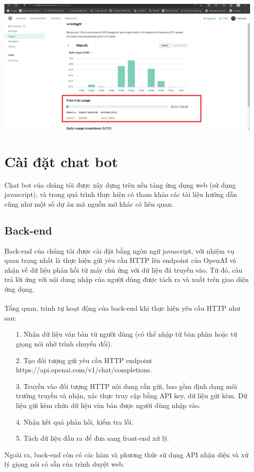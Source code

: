 \documentclass[a4paper, 12pt]{article}
\begin{document}
\begin{itemize}
\begin{centering}
		\includegraphics[width = 170mm]{4.5.png}
	\end{centering}
	\end{itemize}
	
	\section{Cài đặt chat bot}
	Chat bot của chúng tôi được xây dựng trên nền tảng ứng dụng web (sử dụng javascript), và trong quá trình thực hiện có tham khảo các tài liệu hướng dẫn cũng như một số dự án mã nguồn mở khác có liên quan.
	\subsection{Back-end}
	Back-end của chúng tôi được cài đặt bằng ngôn ngữ javascript, với nhiệm vụ quan trọng nhất là thực hiện gửi yêu cầu HTTP lên endpoint của OpenAI và nhận về dữ liệu phản hồi từ máy chủ  ứng với dữ liệu đã truyền vào. Từ đó, câu trả lời ứng với nội dung nhập của người dùng được tách ra và xuất trên giao diện ứng dụng.
	\\
	\\
	Tổng quan, trình tự hoạt động của back-end khi thực hiện yêu cầu HTTP như sau:
	\begin{itemize}
		\item[1.] Nhận dữ liệu văn bản từ người dùng (có thể nhập từ bàn phím hoặc từ giọng nói nhờ trình chuyển đổi).
		\item[2.] Tạo đối tượng gửi yêu cầu HTTP endpoint https://api.openai.com/v1/chat/completions.
		\item[3.] Truyền vào đối tượng HTTP nội dung cần gửi, bao gồm định dạng môi trường truyền và nhận, xác thực truy cập bằng API key, dữ liệu gửi kèm. Dữ liệu gửi kèm chứa dữ liệu văn bản được người dùng nhập vào.
		\item[4.] Nhận kết quả phản hồi, kiểm tra lỗi.
		\item[5.] Tách dữ liệu đầu ra để đưa sang front-end xử lý.
	\end{itemize}
	Ngoài ra, back-end còn có các hàm và phương thức sử dụng API nhận diện và xử lý giọng nói có sẵn của trình duyệt web.
	
\end{document}
